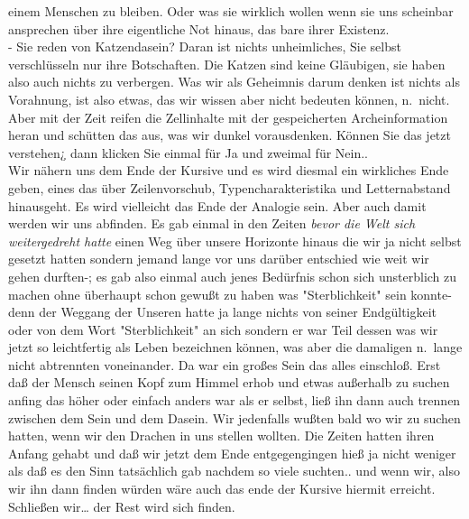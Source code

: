 \documentclass[
]{article}
\begin{document}
einem Menschen zu bleiben. Oder was sie wirklich wollen wenn sie uns
scheinbar ansprechen über ihre eigentliche Not hinaus, das bare ihrer
Existenz.\\
- Sie reden von Katzendasein? Daran ist nichts unheimliches, Sie selbst
verschlüsseln nur ihre Botschaften. Die Katzen sind keine Gläubigen, sie
haben also auch nichts zu verbergen. Was wir als Geheimnis darum denken
ist nichts als Vorahnung, ist also etwas, das wir wissen aber nicht
bedeuten können, n.~nicht. Aber mit der Zeit reifen die Zellinhalte mit
der gespeicherten Archeinformation heran und schütten das aus, was wir
dunkel vorausdenken. Können Sie das jetzt verstehen¿ dann klicken Sie
einmal für Ja und zweimal für Nein..\\
Wir nähern uns dem Ende der Kursive und es wird diesmal ein wirkliches
Ende geben, eines das über Zeilenvorschub, Typencharakteristika und
Letternabstand hinausgeht. Es wird vielleicht das Ende der Analogie
sein. Aber auch damit werden wir uns abfinden. Es gab einmal in den
Zeiten \emph{bevor die Welt sich weitergedreht hatte }einen Weg über
unsere Horizonte hinaus die wir ja nicht selbst gesetzt hatten sondern
jemand lange vor uns darüber entschied wie weit wir gehen durften-; es
gab also einmal auch jenes Bedürfnis schon sich unsterblich zu machen
ohne überhaupt schon gewußt zu haben was "Sterblichkeit" sein konnte-
denn der Weggang der Unseren hatte ja lange nichts von seiner
Endgültigkeit oder von dem Wort "Sterblichkeit" an sich sondern er war
Teil dessen was wir jetzt so leichtfertig als Leben bezeichnen können,
was aber die damaligen n.~lange nicht abtrennten voneinander. Da war ein
großes Sein das alles einschloß. Erst daß der Mensch seinen Kopf zum
Himmel erhob und etwas außerhalb zu suchen anfing das höher oder einfach
anders war als er selbst, ließ ihn dann auch trennen zwischen dem Sein
und dem Dasein. Wir jedenfalls wußten bald wo wir zu suchen hatten, wenn
wir den Drachen in uns stellen wollten. Die Zeiten hatten ihren Anfang
gehabt und daß wir jetzt dem Ende entgegengingen hieß ja nicht weniger
als daß es den Sinn tatsächlich gab nachdem so viele suchten.. und wenn
wir, also wir ihn dann finden würden wäre auch das ende der Kursive
hiermit erreicht. Schließen wir\ldots{} der Rest wird sich finden.
\end{document}
